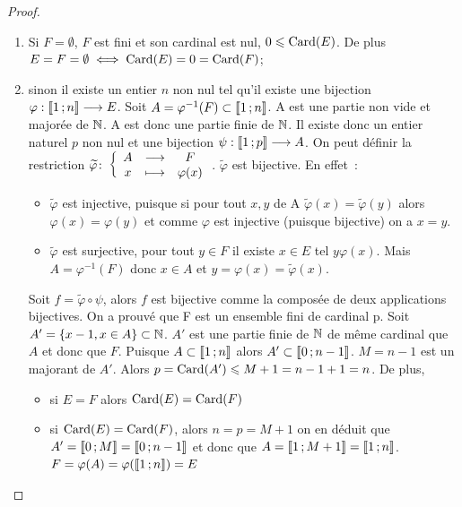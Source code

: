 \begin{proof}
  \begin{enumerate}
    \item Si \(F = \emptyset\), \(F\) est fini et son cardinal est nul,
      \(0\leqslant\operatorname{Card}(E)\). De plus \(E = F = \emptyset \iff \operatorname{Card}(E) = 0
      = \operatorname{Card}(F)\);
    \item sinon il existe un entier \(n\) non nul tel qu'il existe une
      bijection \(\varphi:\mathopen{\llbracket}1\mathclose{}\mathpunct{};n\mathclose{\rrbracket} \longrightarrow{} E\). Soit
      \(A = \varphi^{-1}(F) \subset\mathopen{\llbracket}1\mathclose{}\mathpunct{};n\mathclose{\rrbracket}\). A est une
      partie non vide et majorée de \(\mathbb{N}\). A est donc une partie finie de
      \(\mathbb{N}\).  Il existe donc un entier naturel \(p\) non nul et une
      bijection \(\psi:\mathopen{\llbracket}1\mathclose{}\mathpunct{};p\mathclose{\rrbracket} \longrightarrow{} A\). On peut
      définir la restriction
      \(\widetilde{\varphi}\colon\left\{\begin{array}{ccc}A & \longrightarrow &F\\x & \longmapsto & \varphi(x)\end{array}\right.\).
      \(\widetilde{\varphi}\) est bijective. En effet~:
      \begin{itemize}
        \item \(\widetilde{\varphi}\) est injective, puisque si pour tout
          \(x, y\) de A \(\widetilde{\varphi}(x) = \widetilde{\varphi}(y)\)
          alors \(\varphi(x) = \varphi(y)\) et comme \(\varphi\) est
          injective (puisque bijective) on a \(x = y\).
        \item \(\widetilde{\varphi}\) est surjective, pour tout \(y\in F\)
          il existe \(x\in E\) tel \(y\varphi(x)\). Mais \(A =
          \varphi^{-1}(F)\) donc \(x\in A\) et \(y = \varphi(x) =
          \widetilde{\varphi}(x)\).
      \end{itemize}
      Soit \(f = \widetilde{\varphi}\circ \psi\), alors \(f\) est bijective
      comme la composée de deux applications bijectives. On a prouvé que F
      est un ensemble fini de cardinal p. Soit \(A' = \{x - 1, x\in
      A\}\subset \mathbb{N}\). \(A'\) est une partie finie de \(\mathbb{N}\) de même
      cardinal que \(A\) et donc que \(F\). Puisque
      \(A\subset\mathopen{\llbracket}1\mathclose{}\mathpunct{};n\mathclose{\rrbracket}\) alors
      \(A'\subset\mathopen{\llbracket}0\mathclose{}\mathpunct{};n - 1\mathclose{\rrbracket}\). \(M = n - 1\) est un
      majorant de \(A'\). Alors \(p = \operatorname{Card}(A')\leqslant M + 1 = n - 1 + 1 =
      n\). De plus,
      \begin{itemize}
        \item si \(E = F\) alors \(\operatorname{Card}(E) = \operatorname{Card}(F)\)
        \item si \(\operatorname{Card}(E) = \operatorname{Card}(F)\), alors \(n = p = M + 1\) on en
          déduit que \(A' = \mathopen{\llbracket}0\mathclose{}\mathpunct{};M\mathclose{\rrbracket} = \mathopen{\llbracket}0\mathclose{}\mathpunct{};n
          - 1\mathclose{\rrbracket}\) et donc que \(A = \mathopen{\llbracket}1\mathclose{}\mathpunct{};M + 1\mathclose{\rrbracket} =
          \mathopen{\llbracket}1\mathclose{}\mathpunct{};n\mathclose{\rrbracket}\).  \(F = \varphi(A) =
          \varphi(\mathopen{\llbracket}1\mathclose{}\mathpunct{};n\mathclose{\rrbracket}) = E\)
      \end{itemize}
  \end{enumerate}
\end{proof}

